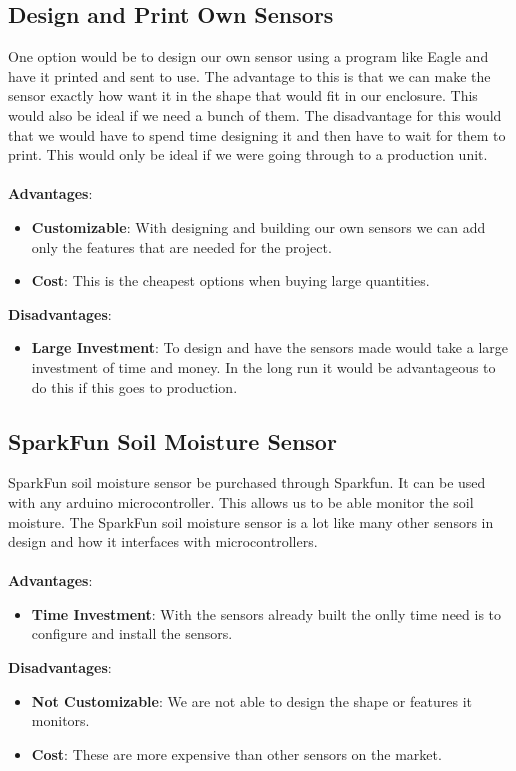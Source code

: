 \documentclass[onecolumn, draftclsnofoot,10pt, compsoc]{IEEEtran}
\begin{document}
		\subsection{Design and Print Own Sensors}
		One option would be to design our own sensor using a program like Eagle and
		have it printed and sent to use. The advantage to this is that we can make the
		sensor exactly how want it in the shape that would fit in our enclosure. This
		would also be ideal if we need a bunch of them. The disadvantage for this would
		that we would have to spend time designing it and then have to wait for them
		to print. This would only be ideal if we were going through to a production
		unit.
		\\\\
		\textbf{Advantages}:
		\begin{itemize}
			\item \textbf{Customizable}: With designing and building our own sensors
			we can add only the features that are needed for the project.
			\item \textbf{Cost}: This is the cheapest options when buying large quantities.
		\end{itemize}
		\noindent\textbf{Disadvantages}:
		\begin{itemize}
			\item \textbf{Large Investment}: To design and have the sensors made would
			take a large investment of time and money. In the long run it would be advantageous
			to do this if this goes to production.
		\end{itemize}
		\subsection{SparkFun Soil Moisture Sensor}
		SparkFun soil moisture sensor  be purchased through Sparkfun. It can be used
		with any arduino microcontroller. This allows us to be able monitor the soil
		moisture. The SparkFun soil moisture sensor is a lot like many other sensors
		in design and how it interfaces with microcontrollers.
		\\\\
		\textbf{Advantages}:
		\begin{itemize}
			\item \textbf{Time Investment}: With the sensors already built the onlly time
			need is to configure and install the sensors.
		\end{itemize}
		\noindent\textbf{Disadvantages}:
		\begin{itemize}
			\item \textbf{Not Customizable}: We are not able to design the shape or features
			it monitors.
			\item \textbf{Cost}: These are more expensive than other sensors on the market.
		\end{itemize}
\end{document}

